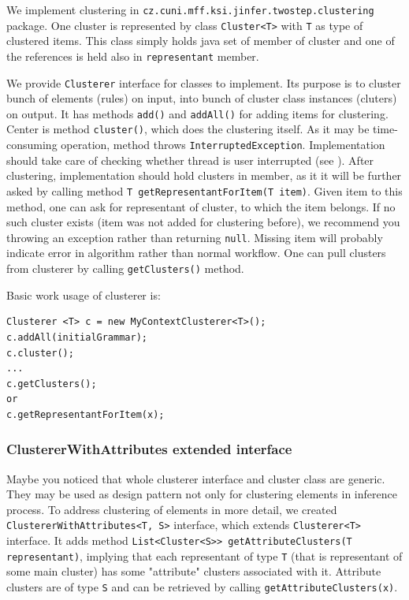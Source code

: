 \documentclass[a4paper,10pt,oneside]{article}
\newcommand{\code}[1]{\texttt{#1}}
\begin{document}
We implement clustering in \code{cz.cuni.mff.ksi.jinfer.twostep.clustering} package.
One cluster is represented by class \code{Cluster<T>} with \code{T} as type of clustered items.
This class simply holds java set of member of cluster and one of the references is held also in \code{representant} member.

We provide \code{Clusterer} interface for classes to implement.
Its purpose is to cluster bunch of elements (rules) on input, into  bunch of cluster class instances (cluters) on output.
It has methods \code{add()} and \code{addAll()} for adding items for clustering.
Center is method \code{cluster()}, which does the clustering itself.
As it may be time-consuming operation, method throws \code{InterruptedException}.
Implementation should take care of checking whether thread is user interrupted (see \cite[p. 12]{archdoc}).
After clustering, implementation should hold clusters in member, as it it will be further asked by calling method \code{T getRepresentantForItem(T item)}.
Given item to this method, one can ask for representant of cluster, to which the item belongs.
If no such cluster exists (item was not added for clustering before), we recommend you throwing an exception rather than returning \code{null}.
Missing item will probably  indicate error in algorithm rather than normal workflow.
One can pull clusters from clusterer by calling \code{getClusters()} method.

Basic work usage of clusterer is:
\begin{verbatim}
Clusterer <T> c = new MyContextClusterer<T>();
c.addAll(initialGrammar);
c.cluster();
...
c.getClusters();
or
c.getRepresentantForItem(x);
\end{verbatim}

\subsubsection{ClustererWithAttributes extended interface}
Maybe you noticed that whole clusterer interface and cluster class are generic.
They may be used as design pattern not only for clustering elements in inference process.
To address clustering of elements in more detail, we created \code{ClustererWithAttributes<T, S>} interface, which extends \code{Clusterer<T>} interface.
It adds method \code{List<Cluster<S>{}> getAttributeClusters(T representant)}, implying that each representant of
type \code{T} (that is representant of some main cluster) has some "attribute" clusters associated with it.
Attribute clusters are of type \code{S} and can be retrieved by calling \code{getAttributeClusters(x)}.
\end{document}
